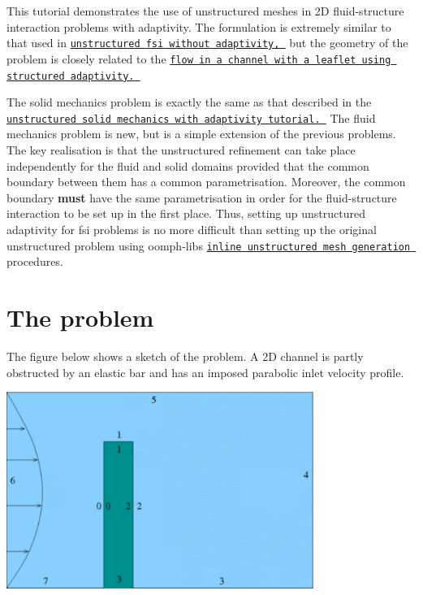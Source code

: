 This tutorial demonstrates the use of unstructured meshes in 2D fluid-\/structure interaction problems with adaptivity. The formulation is extremely similar to that used in \href{../../../interaction/unstructured_fsi/html/index.html}{\tt unstructured fsi without adaptivity, } but the geometry of the problem is closely related to the \href{../../fsi_channel_with_leaflet/html/index.html}{\tt flow in a channel with a leaflet using structured adaptivity. }

The solid mechanics problem is exactly the same as that described in the \href{../../../solid/unstructured_adaptive_solid/html/index.html}{\tt unstructured solid mechanics with adaptivity tutorial. } The fluid mechanics problem is new, but is a simple extension of the previous problems. The key realisation is that the unstructured refinement can take place independently for the fluid and solid domains provided that the common boundary between them has a common parametrisation. Moreover, the common boundary {\bfseries must} have the same parametrisation in order for the fluid-\/structure interaction to be set up in the first place. Thus, setting up unstructured adaptivity for fsi problems is no more difficult than setting up the original unstructured problem using {\ttfamily oomph-\/lib\textquotesingle{}s} \href{../../../meshes/mesh_from_inline_triangle/html/index.html}{\tt inline unstructured mesh generation } procedures.



 

\hypertarget{index_the_problem}{}\section{The problem}\label{index_the_problem}
The figure below shows a sketch of the problem. A 2D channel is partly obstructed by an elastic bar and has an imposed parabolic inlet velocity profile.

 
\begin{DoxyImage}
\includegraphics[width=0.75\textwidth]{fsi_sketch}
\end{DoxyImage}


